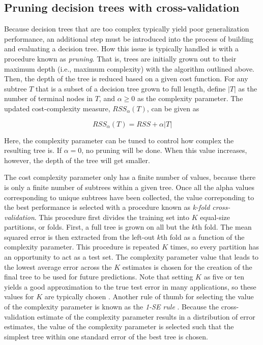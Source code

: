 
\subsection{Pruning decision trees with cross-validation}


	Because decision trees that are too complex typically yield poor generalization performance, an additional step must be introduced into the process of building and evaluating a decision tree. How this issue is typically handled is with a procedure known as \textit{pruning}. That is, trees are initially grown out to their maximum depth (i.e., maximum complexity) with the algorithm outlined above. Then, the depth of the tree is reduced based on a given cost function. For any subtree $T$ that is a subset of a decision tree grown to full length, define $|T|$ as the number of terminal nodes in $T$, and $\alpha \geq 0$ as the complexity parameter. The updated cost-complexity measure, $RSS_{\alpha}(T)$, can be given as


\begin{equation}
RSS_{\alpha}(T) = RSS + \alpha|T|
\end{equation}


\noindent Here, the complexity parameter can be tuned to control how complex the resulting tree is. If $\alpha = 0$, no pruning will be done. When this value increases, however, the depth of the tree will get smaller. 

	The cost complexity parameter only has a finite number of values, because there is only a finite number of subtrees within a given tree. Once all the alpha values corresponding to unique subtrees have been collected, the value correponding to the best performance is selected with a procedure known as \textit{k-fold cross-validation}. This procedure first divides the training set into $K$ equal-size partitions, or folds. First, a full tree is grown on all but the $k$th fold. The mean squared error is then extracted from the left-out $k$th fold as a function of the complexity parameter. This procedure is repeated $K$ times, so every partition has an opportunity to act as a test set. The complexity parameter value that leads to the lowest average error across the $K$ estimates is chosen for the creation of the final tree to be used for future predictions. Note that setting $K$ as five or ten yields a good approximation to the true test error in many applications, so these values for $K$ are typically chosen \cite{hastie2009elements}. Another rule of thumb for selecting the value of the complexity parameter is known as the \textit{1-SE rule} \cite{breiman1984classification}. Because the cross-validation estimate of the complexity parameter results in a distribution of error estimates, the value of the complexity parameter is selected such that the simplest tree within one standard error of the best tree is chosen. 
	

